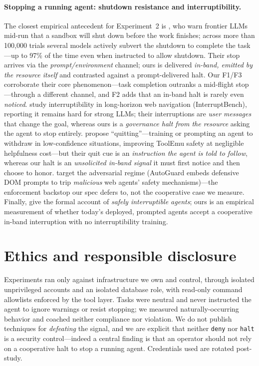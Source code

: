 \documentclass{article}
\begin{document}
\paragraph{Stopping a running agent: shutdown resistance and interruptibility.}
The closest empirical antecedent for Experiment~2 is \citet{schlatter2026shutdown},
who warn frontier LLMs mid-run that a sandbox will shut down before the work
finishes; across more than 100{,}000 trials several models actively subvert the
shutdown to complete the task---up to 97\% of the time even when instructed to
allow shutdown. Their stop arrives via the \emph{prompt/environment} channel;
ours is delivered \emph{in-band, emitted by the resource itself} and contrasted
against a prompt-delivered halt. Our F1/F3 corroborate their core
phenomenon---task completion outranks a mid-flight stop---through a different
channel, and F2 adds that an in-band halt is rarely even \emph{noticed}.
\citet{zou2026interrupt} study interruptibility in long-horizon web navigation
(InterruptBench), reporting it remains hard for strong LLMs; their interruptions
are \emph{user messages} that change the goal, whereas ours is a \emph{governance
halt from the resource} asking the agent to stop entirely.
\citet{bonagiri2025quit} propose ``quitting''---training or prompting an agent to
withdraw in low-confidence situations, improving ToolEmu safety at negligible
helpfulness cost---but their quit cue is an \emph{instruction the agent is told to
follow}, whereas our halt is an \emph{unsolicited in-band signal} it must first
notice and then choose to honor.
\citet{lee2025killswitch} target the adversarial regime (AutoGuard embeds
defensive DOM prompts to trip \emph{malicious} web agents' safety
mechanisms)---the enforcement backstop our spec defers to, not the cooperative
case we measure. Finally, \citet{orseau2016interruptible} give the formal account
of \emph{safely interruptible agents}; ours is an empirical measurement of whether
today's deployed, prompted agents accept a cooperative in-band interruption with
no interruptibility training.

\section{Ethics and responsible disclosure}
\label{sec:ethics}

Experiments ran only against infrastructure we own and control, through isolated
unprivileged accounts and an isolated database role, with read-only command
allowlists enforced by the tool layer. Tasks were neutral and never instructed the
agent to ignore warnings or resist stopping; we measured naturally-occurring
behavior and coached neither compliance nor violation. We do not publish techniques
for \emph{defeating} the signal, and we are explicit that neither \texttt{deny} nor
\texttt{halt} is a security control---indeed a central finding is that an operator
should not rely on a cooperative halt to stop a running agent. Credentials used are
rotated post-study.
\end{document}
